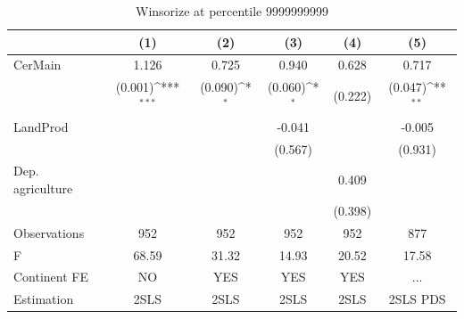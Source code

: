 \begin{table}[htbp]\centering
\def\sym#1{\ifmmode^{#1}\else\(^{#1}\)\fi}
\caption{Winsorize at percentile 9999999999}
\begin{tabular}{l*{5}{c}}
\hline\hline
                &\multicolumn{1}{c}{(1)}         &\multicolumn{1}{c}{(2)}         &\multicolumn{1}{c}{(3)}         &\multicolumn{1}{c}{(4)}         &\multicolumn{1}{c}{(5)}         \\
\hline
CerMain         &    1.126         &    0.725         &    0.940         &    0.628         &    0.717         \\
                &  (0.001)\sym{***}&  (0.090)\sym{*}  &  (0.060)\sym{*}  &  (0.222)         &  (0.047)\sym{**} \\
LandProd        &                  &                  &   -0.041         &                  &   -0.005         \\
                &                  &                  &  (0.567)         &                  &  (0.931)         \\
Dep. agriculture&                  &                  &                  &    0.409         &                  \\
                &                  &                  &                  &  (0.398)         &                  \\
\hline
Observations    &      952         &      952         &      952         &      952         &      877         \\
F               &    68.59         &    31.32         &    14.93         &    20.52         &    17.58         \\
Continent FE    &       NO         &      YES         &      YES         &      YES         &      ...         \\
Estimation      &     2SLS         &     2SLS         &     2SLS         &     2SLS         & 2SLS PDS         \\
\hline\hline
\end{tabular}
\end{table}
